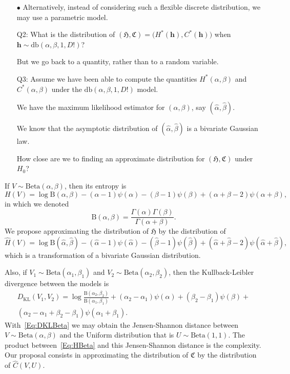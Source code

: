 \documentclass[12pt]{article}
\begin{document}
\begin{itemize}
\item[$\bullet$] Alternatively, instead of considering such a flexible discrete distribution, we may use a parametric model.
\item[Q2:] What is the distribution of $
(\mathfrak{H},\mathfrak{C}) = 
\big(H^*(\bm h),C^*(\bm h)\big)$ when $\bm h\sim\text{db}(\alpha,\beta,1, D!)$?
\item[] But we go back to a quantity, rather than to a random variable.
\item[Q3:] Assume we have been able to compute the quantities $H^*(\alpha,\beta)$ and $C^*(\alpha,\beta)$ under the $\text{db}(\alpha,\beta,1, D!)$ model.
\item[] We have the maximum likelihood estimator for $(\alpha,\beta)$, say $(\widehat\alpha,\widehat\beta)$.
\item[] We know that the asymptotic distribution of $(\widehat\alpha,\widehat\beta)$ is a bivariate Gaussian law.
\item[] How close are we to finding an approximate distribution for $
(\mathfrak{H},\mathfrak{C})$ under $H_0$?
\end{itemize}

If $V\sim\text{Beta}(\alpha,\beta)$, then its entropy is
\begin{equation}
H(V) = \log\text{B}(\alpha,\beta) -
(\alpha-1)\psi(\alpha) -(\beta-1) \psi(\beta) +(\alpha+\beta-2) \psi(\alpha+\beta),
\label{Eq:HBeta}
\end{equation}
in which we denoted
$$
\text{B}(\alpha,\beta) = \frac{\Gamma(\alpha)\Gamma(\beta)}{\Gamma(\alpha+\beta)}.
$$
We propose approximating the distribution of $\mathfrak{H}$ by the distribution of 
\begin{equation}
\widehat{H}(V)= \log\text{B}(\widehat\alpha,\widehat\beta) -
(\widehat\alpha-1)\psi(\widehat\alpha) -(\widehat\beta-1) \psi(\widehat\beta) +(\widehat\alpha+\widehat\beta-2) \psi(\widehat\alpha+\widehat\beta),
\end{equation}
which is a transformation of a bivariate Gaussian distribution.

Also, if $V_1\sim\text{Beta}(\alpha_1,\beta_1)$ and
$V_2\sim\text{Beta}(\alpha_2,\beta_2)$, then the Kullback-Leibler divergence between the models is
\begin{multline}
D_{\text{KL}}(V_1,V_2) = \log\frac{\text{B}(\alpha_2,\beta_2)}{\text{B}(\alpha_1,\beta_1)} +
(\alpha_2-\alpha_1) \psi(\alpha) +
(\beta_2-\beta_1) \psi(\beta) + \\
(\alpha_2-\alpha_1+\beta_2-\beta_1) \psi(\alpha_1+\beta_1).
\label{Eq:DKLBeta}
\end{multline}
With~\eqref{Eq:DKLBeta} we may obtain the Jensen-Shannon distance between $V\sim\text{Beta}(\alpha,\beta)$ and the Uniform distribution that is $U\sim\text{Beta}(1,1)$.
The product between~\eqref{Eq:HBeta} and this Jensen-Shannon distance is the complexity.
Our proposal consists in approximating the distribution of $\mathfrak{C}$ by the distribution of $\widehat{C}(V,U)$.
\end{document}
